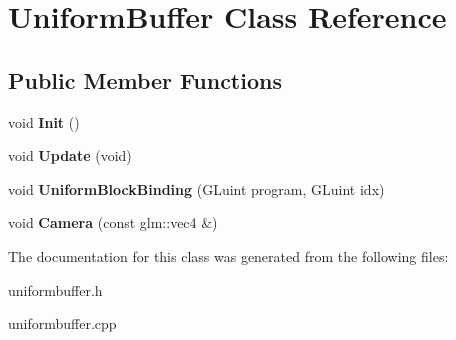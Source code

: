 \hypertarget{classUniformBuffer}{\section{\-Uniform\-Buffer \-Class \-Reference}
\label{classUniformBuffer}
}
\subsection*{\-Public \-Member \-Functions}
\begin{DoxyCompactItemize}
\item 
\hypertarget{classUniformBuffer_a8f747583602c1a409c86ad789a8b6c21}{void {\bfseries \-Init} ()}\label{classUniformBuffer_a8f747583602c1a409c86ad789a8b6c21}

\item 
\hypertarget{classUniformBuffer_a6288ae976b7d0706cbbd5b5b9c2b03f0}{void {\bfseries \-Update} (void)}\label{classUniformBuffer_a6288ae976b7d0706cbbd5b5b9c2b03f0}

\item 
\hypertarget{classUniformBuffer_a05742920d4e64793fa42d872564cdc25}{void {\bfseries \-Uniform\-Block\-Binding} (\-G\-Luint program, \-G\-Luint idx)}\label{classUniformBuffer_a05742920d4e64793fa42d872564cdc25}

\item 
\hypertarget{classUniformBuffer_a9b43415a0fea05ec45dd37c870a8f781}{void {\bfseries \-Camera} (const glm\-::vec4 \&)}\label{classUniformBuffer_a9b43415a0fea05ec45dd37c870a8f781}

\end{DoxyCompactItemize}


\-The documentation for this class was generated from the following files\-:\begin{DoxyCompactItemize}
\item 
uniformbuffer.\-h\item 
uniformbuffer.\-cpp\end{DoxyCompactItemize}
